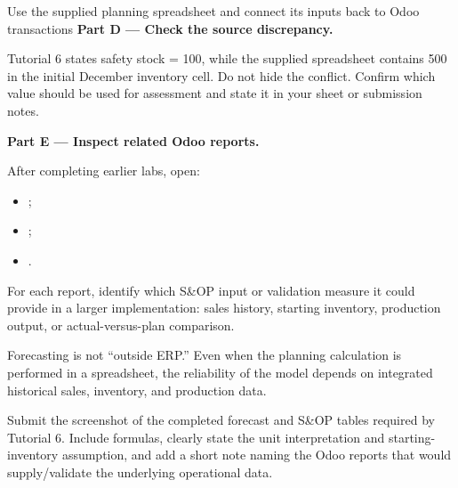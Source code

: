 \begin{labproject}{Use the supplied planning spreadsheet and connect its inputs back to Odoo transactions}
\medskip\noindent\textbf{Part D --- Check the source discrepancy.}

Tutorial 6 states safety stock = 100, while the supplied spreadsheet contains 500 in the initial December inventory cell. Do not hide the conflict. Confirm which value should be used for assessment and state it in your sheet or submission notes.

\medskip\noindent\textbf{Part E --- Inspect related Odoo reports.}

After completing earlier labs, open:
\begin{itemize}
  \item {};
  \item {};
  \item {}.
\end{itemize}

For each report, identify which S\&OP input or validation measure it could provide in a larger implementation: sales history, starting inventory, production output, or actual-versus-plan comparison.

\begin{keyidea}
Forecasting is not ``outside ERP.'' Even when the planning calculation is performed in a spreadsheet, the reliability of the model depends on integrated historical sales, inventory, and production data.
\end{keyidea}
\end{labproject}

\begin{labdeliverable}
Submit the screenshot of the completed forecast and S\&OP tables required by Tutorial 6. Include formulas, clearly state the unit interpretation and starting-inventory assumption, and add a short note naming the Odoo reports that would supply/validate the underlying operational data.
\end{labdeliverable}
